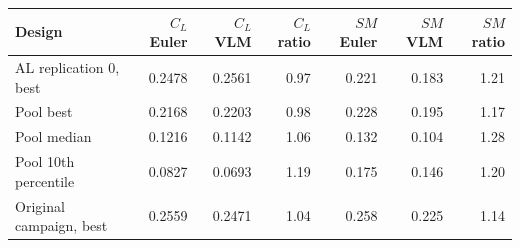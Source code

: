 \begin{tabular}{@{}lrrrrrr@{}}
\toprule
Design & $C_L$ Euler & $C_L$ VLM & $C_L$ ratio & $SM$ Euler & $SM$ VLM & $SM$ ratio \\
\midrule
AL replication 0, best & 0.2478 & 0.2561 & 0.97 & 0.221 & 0.183 & 1.21 \\
Pool best & 0.2168 & 0.2203 & 0.98 & 0.228 & 0.195 & 1.17 \\
Pool median & 0.1216 & 0.1142 & 1.06 & 0.132 & 0.104 & 1.28 \\
Pool 10th percentile & 0.0827 & 0.0693 & 1.19 & 0.175 & 0.146 & 1.20 \\
Original campaign, best & 0.2559 & 0.2471 & 1.04 & 0.258 & 0.225 & 1.14 \\
\bottomrule
\end{tabular}
